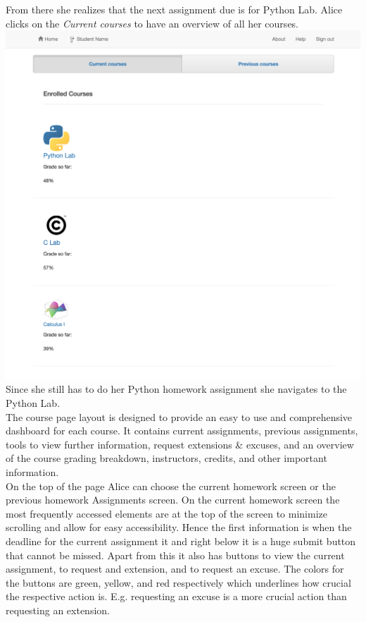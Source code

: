 From there she realizes that the next assignment due is for Python Lab. Alice clicks on the \textit{Current courses} to have an overview of all her courses.\\
\includegraphics[width=\textwidth]{screenshots/CurrentCourses}\\
Since she still has to do her Python homework assignment she navigates to the Python Lab.\\
The course page layout is designed to provide an easy to use and comprehensive dashboard for each course. It contains current assignments, previous assignments, tools to view further information, request extensions \& excuses, and an overview of the course grading breakdown, instructors, credits, and other important information.\\

On the top of the page Alice can choose the current homework screen or the previous homework Assignments screen. On the current homework screen the most frequently accessed elements are at the top of the screen to minimize scrolling and allow for easy accessibility. Hence the first information is when the deadline for the current assignment it and right below it is a huge submit button that cannot be missed. Apart from this it also has buttons to view the current assignment, to request and extension, and to request an excuse. The colors for the buttons are green, yellow, and red respectively which underlines how crucial the respective action is. E.g. requesting an excuse is a more crucial action than requesting an extension.\\

